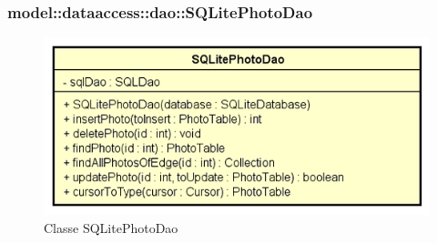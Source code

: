 \documentclass[../DefinizioneDiProdotto.tex]{subfiles}
\begin{document}
\subsubsection{model::dataaccess::dao::SQLitePhotoDao}

    \begin{figure}[H]
        \centering
        \includegraphics{img/SQLitePhotoDao.png}
        \caption{Classe SQLitePhotoDao}\label{fig:model::dataaccess::dao::SQLitePhotoDao} 
    \end{figure}
\end{document}
